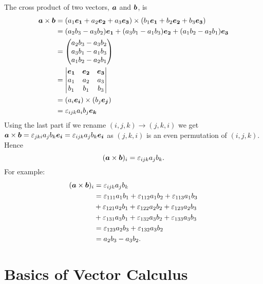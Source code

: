 \documentclass[a4paper]{article}
\begin{document}
    The cross product of two vectors, \(\bm{a}\) and \(\bm{b}\), is
    \begin{align*}
        \bm{a}\times\bm{b} &= (a_1\bm{e_{1}} + a_2\bm{e_{2}} + a_3\bm{e_{3}})\times(b_1\bm{e_{1}} + b_2\bm{e_{2}} + b_3\bm{e_{3}})\\
        &= (a_2b_3 - a_3b_2)\bm{e_{1}} + (a_3b_1 - a_1b_3)\bm{e_{2}} + (a_1b_2 - a_2b_1)\bm{e_{3}}\\
        &= 
        \begin{pmatrix}
            a_2b_3 - a_3b_2\\
            a_3b_1 - a_1b_3\\
            a_1b_2 - a_2b_1
        \end{pmatrix}
        \\
        &=
        \begin{vmatrix}
            \bm{e_{1}} & \bm{e_{2}} & \bm{e_{3}}\\
            a_1 & a_2 & a_3\\
            b_1 & b_1 & b_3
        \end{vmatrix}
        \\
        &= (a_i\bm{e_{i}})\times(b_j\bm{e_{j}})\\
        &= \varepsilon_{ijk}a_ib_j\bm{e_{k}}
    \end{align*}
    Using the last part if we rename \((i, j, k)\rightarrow (j, k, i)\) we get \(\bm{a}\times\bm{b} = \varepsilon_{jki}a_jb_k\bm{e_{i}} = \varepsilon_{ijk}a_jb_k\bm{e_{i}}\) as \((j, k, i)\) is an even permutation of \((i, j, k)\).
    Hence
    \[(\bm{a}\times\bm{b})_i = \varepsilon_{ijk}a_jb_k.\]
    For example:
    \begin{align*}
        (\bm{a}\times\bm{b})_i &= \varepsilon_{ijk}a_jb_k\\
        &= \varepsilon_{111}a_1b_1 + \varepsilon_{112}a_1b_2 + \varepsilon_{113}a_1b_3\\
        &+ \varepsilon_{121}a_2b_1 + \varepsilon_{122}a_2b_2 + \varepsilon_{123}a_2b_3\\
        &+ \varepsilon_{131}a_3b_1 + \varepsilon_{132}a_3b_2 + \varepsilon_{133}a_3b_3\\
        &= \varepsilon_{123}a_2b_3 + \varepsilon_{132}a_3b_2\\
        &= a_2b_3  - a_3b_2.
    \end{align*}
    
    \section{Basics of Vector Calculus}
\end{document}
